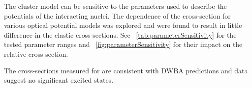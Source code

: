 The cluster model can be sensitive to the parameters used to describe the potentials of the interacting nuclei.  The dependence of the cross-section for various  optical potential models was explored and were found to result in little difference in the elastic cross-sections.  See {\tab}~\ref{tab:parameterSensitivity} for the tested parameter ranges and {\fig}~\ref{fig:parameterSensitivity} for their impact on the relative cross-section.

The cross-sections measured for \reaction are consistent with DWBA predictions and data suggest no significant excited \zp states.
%
% 
% 
